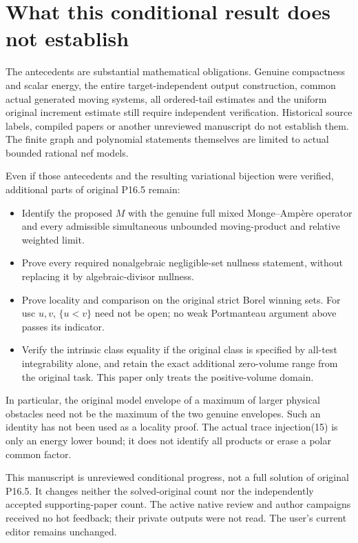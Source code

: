 \documentclass[11pt]{article}
\begin{document}
\section{What this conditional result does not establish}
The antecedents are substantial mathematical obligations.
Genuine compactness and scalar energy, the entire target-independent
output construction, common actual generated moving systems,
all ordered-tail estimates and the uniform original increment estimate
still require independent verification. Historical source labels,
compiled papers or another unreviewed manuscript do not establish them.
The finite graph and polynomial statements themselves are limited to
actual bounded rational nef models.

Even if those antecedents and the resulting variational bijection
were verified, additional parts of original P16.5 remain:
\begin{itemize}
\item Identify the proposed $M$ with the genuine full mixed
Monge--Amp\`ere operator and every admissible simultaneous unbounded
moving-product and relative weighted limit.
\item Prove every required nonalgebraic negligible-set nullness
statement, without replacing it by algebraic-divisor nullness.
\item Prove locality and comparison on the original strict Borel
winning sets. For usc $u,v$, $\{u<v\}$ need not be open; no weak
Portmanteau argument above passes its indicator.
\item Verify the intrinsic class equality if the original class is
specified by all-test integrability alone, and retain the exact
additional zero-volume range from the original task. This paper only
treats the positive-volume domain.
\end{itemize}
In particular, the original model envelope of a maximum of larger
physical obstacles need not be the maximum of the two genuine
envelopes. Such an identity has not been used as a locality proof.
The actual trace injection(15) is only an energy lower bound;
it does not identify all products or erase a polar common factor.

This manuscript is unreviewed conditional progress, not a full solution
of original P16.5. It changes neither the solved-original count nor
the independently accepted supporting-paper count. The active native
review and author campaigns received no hot feedback; their private
outputs were not read. The user's current editor remains unchanged.
\end{document}

